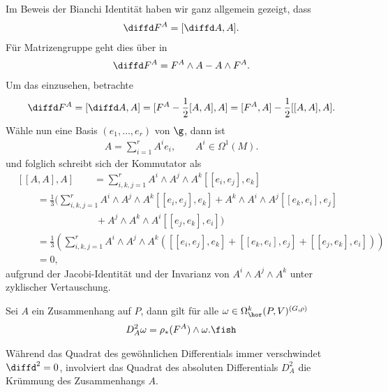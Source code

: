 \documentclass[%
	paper=a5,%
	fleqn,%
	DIV=18,%
	BCOR=0mm,
	fontsize=11pt,
	titlepage=false,%
	bibliography=totoc,
	DIV=18,%
	twoside=true,
	pdftitle=Riemannsche Geometrie,
	pdfauthor=Uwe Semmelmann,
	numbers=noendperiod]%
	{scrbook}
\begin{document}
\begin{rem}
Im Beweis der Bianchi Identität haben wir ganz allgemein gezeigt, dass
\begin{align*}
\diffd F^A = [\diffd A,A].
\end{align*}
Für Matrizengruppe geht dies über in
\begin{align*}
\diffd F^A = F^A\wedge A - A\wedge F^A.
\end{align*}
Um das einzusehen, betrachte
\begin{align*}
\diffd F^A = [\diffd A ,A] = [F^A - \frac{1}{2}[A,A],A]
= [F^A,A] - \frac{1}{2}[[A,A],A].
\end{align*}
Wähle nun eine Basis $(e_1,\ldots,e_r)$ von $\g$, dann ist 
\begin{align*}
A = \sum_{i=1}^r A^i e_i,\qquad A^i\in\Omega^1(M).
\end{align*}
und folglich schreibt sich der Kommutator als
\begin{align*}
&[[A,A],A] 
\qquad= \sum_{i,k,j=1}^r A^i\!\wedge\! A^j\! \wedge\! A^k [[e_i,e_j],e_k]\\
&\qquad= \frac{1}{3}\Biggl(\sum_{i,k,j=1}^r A^i\!\wedge\! A^j\! \wedge\! A^k
[[e_i,e_j],e_k]+ A^k\!\wedge\! A^i\! \wedge\! A^j [[e_k,e_i],e_j]\\
&\qquad\qquad\qquad\qquad+
A^j\!\wedge\! A^k\! \wedge\! A^i [[e_j,e_k],e_i]
\Biggr)\\ 
&\qquad= \frac{1}{3}\left(\sum_{i,k,j=1}^r A^i\!\wedge\! A^j\! \wedge\!
A^k\left( [[e_i,e_j],e_k]+
 [[e_k,e_i],e_j]+
 [[e_j,e_k],e_i]\right)
\right) \\ &\qquad= 0,
\end{align*}
aufgrund der Jacobi-Identität und der Invarianz von $A^i\wedge A^j\wedge
A^k$ unter zyklischer Vertauschung.\map
\end{rem}

\begin{prop}
Sei $A$ ein Zusammenhang auf $P$, dann gilt für alle
$\omega\in\Omega_\hor^k(P,V)^{(G,\rho)}$
\begin{align*}
D_A^2 \omega = \rho_*(F^A)\wedge \omega.\fish
\end{align*}
\end{prop}

Während das Quadrat des gewöhnlichen Differentials immer verschwindet $\diffd^2
= 0$, involviert das Quadrat des absoluten Differentials $D_A^2$ die Krümmung
des Zusammenhangs $A$.
\end{document}
